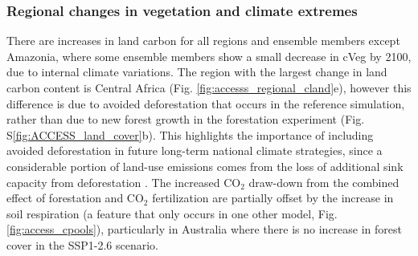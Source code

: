 \documentclass[]{article}
\begin{document}

\subsubsection{Regional changes in vegetation and climate extremes}

There are increases in land carbon for all regions and ensemble members except Amazonia, where some ensemble members show a small decrease in cVeg by 2100, due to internal climate variations.
The region with the largest change in land carbon content is Central Africa (Fig. \ref{fig:accesss_regional_cland}e), however this difference is due to avoided deforestation that occurs in the reference simulation, rather than due to new forest growth in the forestation experiment (Fig. S\ref{fig:ACCESS_land_cover}b).
This highlights the importance of including avoided deforestation in future long-term national climate strategies, since a considerable portion of land-use emissions comes from the loss of additional sink capacity from deforestation \parencite{gitz_amplifying_2003, pongratz_terminology_2014, obermeier_modelled_2021}.
The increased CO$_2$ draw-down from the combined effect of forestation and CO$_2$ fertilization are partially offset by the increase in soil respiration (a feature that only occurs in one other model, Fig. \ref{fig:access_cpools}), particularly in Australia where there is no increase in forest cover in the SSP1-2.6 scenario.
\end{document}
